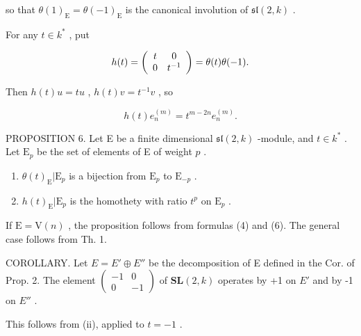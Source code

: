 so that \(\theta(1)_{\mathrm{E}} = \theta(-1)_{\mathrm{E}}\) is the canonical involution of \(\mathfrak{sl}(2,k)\) .

For any \(t\in k^{*}\) , put

\[
h (t) = \left( \begin{array}{c c} t & 0 \\ 0 & t ^ {- 1} \end{array} \right) = \theta (t) \theta (- 1).
\]

Then \(h(t)u = tu\) , \(h(t)v = t^{-1}v\) , so

\[
h (t) e _ {n} ^ {(m)} = t ^ {m - 2 n} e _ {n} ^ {(m)}.\tag{6}
\]

PROPOSITION 6. Let E be a finite dimensional \(\mathfrak{sl}(2,k)\) -module, and \(t\in k^{*}\) . Let \(\mathrm{E}_p\) be the set of elements of E of weight \(p\) .

\begin{enumerate}
\def\labelenumi{(\roman{enumi})}
\item
  \(\theta(t)_{\mathrm{E}}|\mathrm{E}_{p}\) is a bijection from \(\mathrm{E}_p\) to \(\mathrm{E}_{-p}\) .
\item
  \(h(t)_{\mathrm{E}}|\mathrm{E}_p\) is the homothety with ratio \(t^p\) on \(\mathrm{E}_p\) .
\end{enumerate}

If \(\mathrm{E} = \mathrm{V}(n)\) , the proposition follows from formulas (4) and (6). The general case follows from Th. 1.

COROLLARY. Let \(E = E' \oplus E''\) be the decomposition of E defined in the Cor. of Prop. 2. The element \(\begin{pmatrix}-1 & 0 \\ 0 & -1\end{pmatrix}\) of \(\mathbf{SL}(2, k)\) operates by +1 on \(E'\) and by -1 on \(E''\) .

This follows from (ii), applied to \(t = -1\) .

